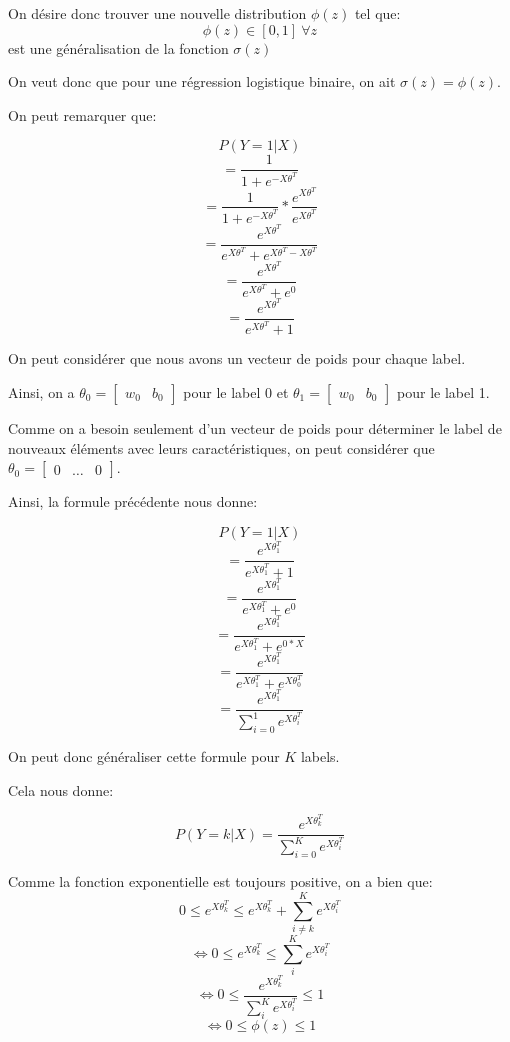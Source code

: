 \documentclass[
]{article}
\begin{document}
On désire donc trouver une nouvelle distribution \(\phi(z)\) tel que:
\[\phi(z) \in [0, 1]\ \forall z\] est une généralisation de la fonction
\(\sigma(z)\)

On veut donc que pour une régression logistique binaire, on ait
\(\sigma(z) = \phi(z)\).

On peut remarquer que:

\[P(Y = 1 | X)\] \[=\frac{1}{1 + e^{-X \theta^T}}\]
\[=\frac{1}{1 + e^{-X \theta^T}} * \frac{e^{X \theta^T}}{e^{X \theta^T}}\]
\[=\frac{e^{X \theta^T}}{e^{X \theta^T} + e^{X \theta^T - X \theta^T}}\]
\[=\frac{e^{X \theta^T}}{e^{X \theta^T} + e^0}\]
\[=\frac{e^{X \theta^T}}{e^{X \theta^T} + 1}\]

On peut considérer que nous avons un vecteur de poids pour chaque label.

Ainsi, on a \(\theta_0 = \begin{bmatrix} w_0 & b_0 \end{bmatrix}\) pour
le label 0 et \(\theta_1 = \begin{bmatrix} w_0 & b_0 \end{bmatrix}\)
pour le label 1.

Comme on a besoin seulement d'un vecteur de poids pour déterminer le
label de nouveaux éléments avec leurs caractéristiques, on peut
considérer que
\(\theta_0 = \begin{bmatrix} 0 & \dots & 0 \end{bmatrix}\).

Ainsi, la formule précédente nous donne:

\[P(Y = 1 | X)\] \[=\frac{e^{X \theta_1^T}}{e^{X \theta_1^T} + 1}\]
\[=\frac{e^{X \theta_1^T}}{e^{X \theta_1^T} + e^0}\]
\[=\frac{e^{X \theta_1^T}}{e^{X \theta_1^T} + e^{0 * X}}\]
\[=\frac{e^{X \theta_1^T}}{e^{X \theta_1^T} + e^{X \theta_0^T}}\]
\[=\frac{e^{X \theta_1^T}}{\sum_{i = 0}^1 e^{X \theta_i^T}}\]

On peut donc généraliser cette formule pour \(K\) labels.

Cela nous donne:

\[P(Y = k| X )=\frac{e^{X \theta_k^T}}{\sum_{i = 0}^K e^{X \theta_i^T}}\]

Comme la fonction exponentielle est toujours positive, on a bien que:
\[0 \leq e^{X \theta_k^T} \leq e^{X \theta_k^T} + \sum_{i \neq k}^K e^{X \theta_i^T}\]
\[\Leftrightarrow 0 \leq e^{X \theta_k^T} \leq \sum_{i}^K e^{X \theta_i^T}\]
\[\Leftrightarrow 0 \leq \frac{e^{X \theta_k^T}}{\sum_{i}^K e^{X \theta_i^T}} \leq 1\]
\[\Leftrightarrow 0 \leq \phi(z) \leq 1\]
\end{document}
